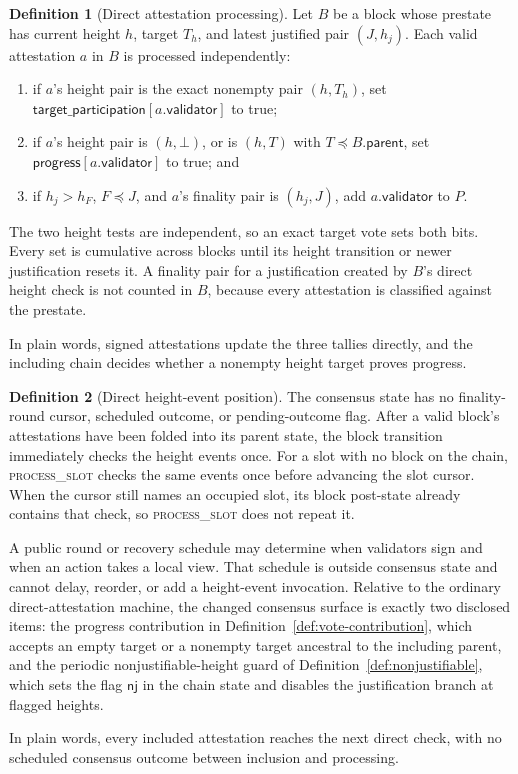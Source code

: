 \ifx\litemode\undefined\documentclass{article}\fi
\theoremstyle{plain}
\theoremstyle{definition}
\newtheorem{definition}{Definition}
\theoremstyle{remark}
\newcommand{\targetParticipation}{\mathsf{target\_participation}}
\newcommand{\progressBit}{\mathsf{progress}}
\newcommand{\validator}{\mathsf{validator}}
\newcommand{\nj}{\mathsf{nj}}
\newcommand{\parent}{\mathsf{parent}}
\begin{document}
\begin{definition}[Direct attestation processing]
\label{def:block-attestation-processing}
Let \(B\) be a block whose prestate has current height \(h\), target \(T_h\),
and latest justified pair \((J,h_j)\).  Each valid attestation \(a\) in \(B\)
is processed independently:
\begin{enumerate}
 \item if \(a\)'s height pair is the exact nonempty pair \((h,T_h)\), set
   \(\targetParticipation[a.\validator]\) to true;
 \item if \(a\)'s height pair is \((h,\bot)\), or is \((h,T)\) with
   \(T\preceq B.\parent\), set \(\progressBit[a.\validator]\) to true; and
 \item if \(h_j>h_F\), \(F\preceq J\), and \(a\)'s finality pair is
   \((h_j,J)\), add \(a.\validator\) to \(P\).
\end{enumerate}
The two height tests are independent, so an exact target vote sets both bits.
Every set is cumulative across blocks until its height transition or newer
justification resets it.  A finality pair for a justification created by
\(B\)'s direct height check is not counted in \(B\), because every
attestation is classified against the prestate.

In plain words, signed attestations update the three tallies directly, and
the including chain decides whether a nonempty height target proves progress.
\end{definition}

\begin{definition}[Direct height-event position]
\label{def:direct-height-position}
The consensus state has no finality-round cursor, scheduled outcome, or
pending-outcome flag.  After a valid block's attestations have been folded
into its parent state, the block transition immediately checks the height
events once.  For a slot with no block on the chain,
\textsc{process\_slot} checks the same events once before advancing the slot
cursor.  When the cursor still names an occupied slot, its block post-state
already contains that check, so \textsc{process\_slot} does not repeat it.

A public round or recovery schedule may determine when validators sign and
when an action takes a local view.  That schedule is outside consensus state
and cannot delay, reorder, or add a height-event invocation.  Relative to the
ordinary direct-attestation machine, the changed consensus surface is
exactly two disclosed items: the progress contribution in
Definition~\ref{def:vote-contribution}, which accepts an empty target or a
nonempty target ancestral to the including parent, and the periodic
nonjustifiable-height guard of Definition~\ref{def:nonjustifiable}, which
sets the flag \(\nj\) in the chain state and disables the
justification branch at flagged heights.

In plain words, every included attestation reaches the next direct check,
with no scheduled consensus outcome between inclusion and processing.
\end{definition}
\end{document}
